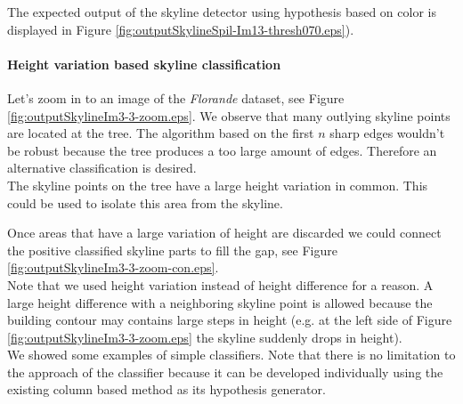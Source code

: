 The expected output of the skyline detector using hypothesis based on color is
displayed in Figure \ref{fig:outputSkylineSpil-Im13-thresh070.eps}). 
\clearpage

\paragraph{Height variation based skyline classification}
Let's zoom in to an image of the \emph{Florande} dataset, see Figure \ref{fig:outputSkylineIm3-3-zoom.eps}.
We observe that many outlying skyline points are located at the tree.  The algorithm based on the
first $n$ sharp edges wouldn't be robust because the tree produces a too large
amount of edges. Therefore an alternative classification is desired.\\

The skyline points on the tree have a large height variation in common.
This could be used to isolate this area from the skyline.

Once areas that have a large variation of height are discarded we could connect
the positive classified skyline parts to fill the gap, see Figure
\ref{fig:outputSkylineIm3-3-zoom-con.eps}.\\

Note that we used height variation instead of height difference for a reason.  A
large height difference with a neighboring skyline point is allowed because the
building contour may contains large steps in height (e.g. at the left side of
Figure \ref{fig:outputSkylineIm3-3-zoom.eps} the skyline suddenly drops in
height).\\

We showed some examples of simple classifiers. Note that there is no limitation
to the approach of the classifier because it can be developed individually using
the existing column based method as its hypothesis generator.

\newpage
{}
\clearpage




